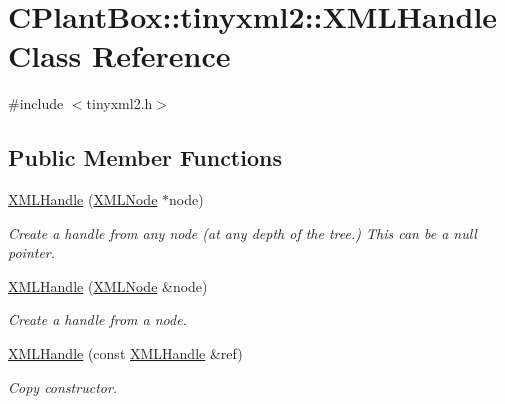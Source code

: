 \hypertarget{classCPlantBox_1_1tinyxml2_1_1XMLHandle}{}\section{C\+Plant\+Box\+:\+:tinyxml2\+:\+:X\+M\+L\+Handle Class Reference}
\label{classCPlantBox_1_1tinyxml2_1_1XMLHandle}


{\ttfamily \#include $<$tinyxml2.\+h$>$}

\subsection*{Public Member Functions}
\begin{DoxyCompactItemize}
\item 
\mbox{\label{classCPlantBox_1_1tinyxml2_1_1XMLHandle_af3ec05f59ad6472546ce030ae2a56f38}} 
\hyperlink{classCPlantBox_1_1tinyxml2_1_1XMLHandle_af3ec05f59ad6472546ce030ae2a56f38}{X\+M\+L\+Handle} (\hyperlink{classCPlantBox_1_1tinyxml2_1_1XMLNode}{X\+M\+L\+Node} $\ast$node)
\begin{DoxyCompactList}\small\item\em Create a handle from any node (at any depth of the tree.) This can be a null pointer. \end{DoxyCompactList}\item 
\mbox{\label{classCPlantBox_1_1tinyxml2_1_1XMLHandle_a99a8b9d6520d6d570d29aeb94f68608b}} 
\hyperlink{classCPlantBox_1_1tinyxml2_1_1XMLHandle_a99a8b9d6520d6d570d29aeb94f68608b}{X\+M\+L\+Handle} (\hyperlink{classCPlantBox_1_1tinyxml2_1_1XMLNode}{X\+M\+L\+Node} \&node)
\begin{DoxyCompactList}\small\item\em Create a handle from a node. \end{DoxyCompactList}\item 
\mbox{\label{classCPlantBox_1_1tinyxml2_1_1XMLHandle_a72b7425d663edeece9b89c0d46edacfb}} 
\hyperlink{classCPlantBox_1_1tinyxml2_1_1XMLHandle_a72b7425d663edeece9b89c0d46edacfb}{X\+M\+L\+Handle} (const \hyperlink{classCPlantBox_1_1tinyxml2_1_1XMLHandle}{X\+M\+L\+Handle} \&ref)
\begin{DoxyCompactList}\small\item\em Copy constructor. \end{DoxyCompactList}\item 

\end{DoxyCompactItemize}
